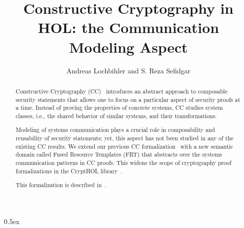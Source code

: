\documentclass[11pt,a4paper]{article}
\begin{document}
\title{Constructive Cryptography in HOL: the Communication Modeling Aspect}
\author{Andreas Lochbihler and S. Reza Sefidgar}
\maketitle

\begin{abstract}
Constructive Cryptography (CC)~\cite{Maurer2011, Maurer2011a, Maurer2016}
introduces an abstract approach to composable security statements that allows one
to focus on a particular aspect of security proofs at a time.
Instead of proving the properties of concrete systems, CC studies system 
classes, i.e., the shared behavior of similar systems, and their transformations.

Modeling of systems communication plays a crucial role in composability and 
reusability of security statements; yet, this aspect has not been studied
in any of the existing CC results. We extend our previous CC formalization~\cite{Lochbihler2018,Lochbihler2019}
with a new semantic domain called Fused Resource Templates (FRT) that abstracts over
the systems communication patterns in CC proofs. This widens the scope of cryptography proof
formalizations in the {CryptHOL} library~\cite{Lochbihler2017,Lochbihler2016,Basin2020}.

This formalization is described in~\cite{Basin2021}.
\end{abstract}

\tableofcontents

\clearpage

\parindent 0pt\parskip 0.5ex





\end{document}
